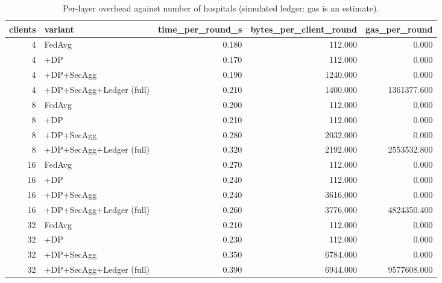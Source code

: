 \begin{table}
\caption{Per-layer overhead against number of hospitals (simulated ledger: gas is an estimate).}
\label{tab:T16_overhead_simulated}
\begin{tabular}{rlrrr}
\toprule
clients & variant & time\_per\_round\_s & bytes\_per\_client\_round & gas\_per\_round \\
\midrule
4 & FedAvg & 0.180 & 112.000 & 0.000 \\
4 & +DP & 0.170 & 112.000 & 0.000 \\
4 & +DP+SecAgg & 0.190 & 1240.000 & 0.000 \\
4 & +DP+SecAgg+Ledger (full) & 0.210 & 1400.000 & 1361377.600 \\
8 & FedAvg & 0.200 & 112.000 & 0.000 \\
8 & +DP & 0.210 & 112.000 & 0.000 \\
8 & +DP+SecAgg & 0.280 & 2032.000 & 0.000 \\
8 & +DP+SecAgg+Ledger (full) & 0.320 & 2192.000 & 2553532.800 \\
16 & FedAvg & 0.270 & 112.000 & 0.000 \\
16 & +DP & 0.240 & 112.000 & 0.000 \\
16 & +DP+SecAgg & 0.240 & 3616.000 & 0.000 \\
16 & +DP+SecAgg+Ledger (full) & 0.260 & 3776.000 & 4824350.400 \\
32 & FedAvg & 0.210 & 112.000 & 0.000 \\
32 & +DP & 0.230 & 112.000 & 0.000 \\
32 & +DP+SecAgg & 0.350 & 6784.000 & 0.000 \\
32 & +DP+SecAgg+Ledger (full) & 0.390 & 6944.000 & 9577608.000 \\
\bottomrule
\end{tabular}
\end{table}
